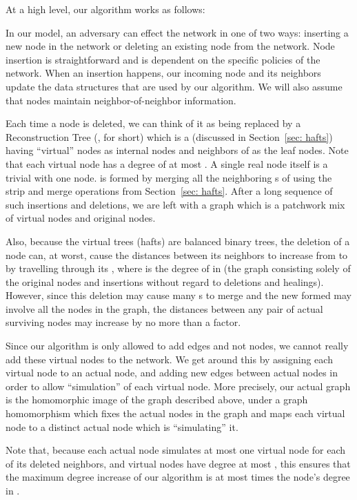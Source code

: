 \documentclass[11pt, letter]{article}
\begin{document}
At a high level, our algorithm works as follows:

In our model, an adversary can effect the network in one of two ways: inserting a new node in the network or deleting an
existing node from the network. Node insertion is straightforward and is dependent on the specific policies of the
network. When an insertion happens, our incoming node and its neighbors update the data structures that are
used by our algorithm. We will also assume that nodes maintain neighbor-of-neighbor information.

Each time a node  is deleted, we can think of it as being replaced by a Reconstruction Tree (, for short) which
is a   (discussed in  Section~\ref{sec: hafts}) having ``virtual'' nodes as internal nodes and
neighbors of  as the leaf nodes. Note that each virtual node has a degree of at most  . A single real node itself is a trivial  with one node.
 is formed by merging all the neighboring s of
 using the strip and merge operations from Section~\ref{sec: hafts}.
After a long sequence of such insertions and deletions, we are left with a graph which is a patchwork mix of virtual
nodes and original nodes. 



Also, because the virtual trees (hafts) are balanced binary trees, the deletion of a node  can, at worst, cause the
distances between its neighbors to increase from  to  by travelling through its , where 
 is the degree of  in  (the graph consisting solely of the original nodes and insertions without regard to
deletions and healings). 
However, since this deletion may cause many s to merge and the new  formed may
involve all the nodes in the graph, the distances between any pair of actual surviving nodes may increase by no
 more than a  factor.
 
Since our algorithm is only allowed to add edges and not nodes, 
we cannot really add these virtual nodes to the network.
We get around this by assigning each virtual node to an actual
node, and adding new edges between actual nodes in order to 
allow ``simulation'' of each virtual node.  More precisely,
our actual graph is the homomorphic image of the graph
described above, under a graph homomorphism which fixes 
the actual nodes in the graph and maps each virtual node
to a distinct actual node which is ``simulating'' it.



Note that, because each actual node simulates at most one
virtual node for each of its deleted neighbors, and virtual nodes have degree at most ,
this ensures that the maximum degree increase of our algorithm
is at most  times the node's degree in .
\end{document}
